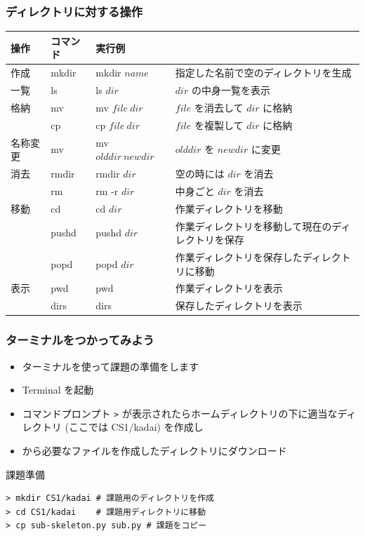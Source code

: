 \begin{frame}
\frametitle{ディレクトリに対する操作}
\scriptsize
  \begin{tabular}{l|l|lp{4cm}}
操作 & コマンド & 実行例 & \\\hline
作成 & mkdir & mkdir $name$ & 指定した名前で空のディレクトリを生成\\
一覧 & ls & ls $dir$ & $dir$ の中身一覧を表示\\
格納 & mv & mv $file\ dir$ & $file$ を消去して $dir$ に格納\\
     & cp & cp $file\ dir$ & $file$ を複製して $dir$ に格納\\
名称変更 & mv & mv $olddir\ newdir$ & $olddir$ を $newdir$ に変更\\
消去 & rmdir & rmdir $dir$ & 空の時には $dir$ を消去\\
     & rm    & rm -r $dir$ & 中身ごと $dir$ を消去\\
移動 & cd & cd $dir$ & 作業ディレクトリを移動\\
     & pushd & pushd $dir$ & 作業ディレクトリを移動して現在のディレクトリを保存\\
     & popd & popd $dir$ & 作業ディレクトリを保存したディレクトリに移動\\
表示 & pwd & pwd & 作業ディレクトリを表示\\
     & dirs & dirs & 保存したディレクトリを表示\\
  \end{tabular}
\end{frame}
\begin{frame}[fragile]
\frametitle{ターミナルをつかってみよう}
  \begin{itemize}
\item ターミナルを使って課題の準備をします
\item Terminal を起動
\item コマンドプロンプト \verb|>| が表示されたらホームディレクトリの下に適当なディレクトリ (ここでは CS1$\slash$kadai) を作成し
\item \href{https://sites.google.com/a/presystems.xyz/sample/home/elementary-computer-science}{} から必要なファイルを作成したディレクトリにダウンロード
  \end{itemize}
  \begin{itembox}{課題準備}
\scriptsize
    \begin{verbatim}
> mkdir CS1/kadai # 課題用のディレクトリを作成
> cd CS1/kadai    # 課題用ディレクトリに移動
> cp sub-skeleton.py sub.py # 課題をコピー
    \end{verbatim}
  \end{itembox}
\end{frame}
%
%
